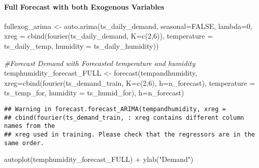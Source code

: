 \documentclass[
]{article}
\newenvironment{Shaded}{\begin{snugshade}}{\end{snugshade}}
\newcommand{\AttributeTok}[1]{\textcolor[rgb]{0.77,0.63,0.00}{#1}}
\newcommand{\CommentTok}[1]{\textcolor[rgb]{0.56,0.35,0.01}{\textit{#1}}}
\newcommand{\ConstantTok}[1]{\textcolor[rgb]{0.00,0.00,0.00}{#1}}
\newcommand{\DecValTok}[1]{\textcolor[rgb]{0.00,0.00,0.81}{#1}}
\newcommand{\FunctionTok}[1]{\textcolor[rgb]{0.00,0.00,0.00}{#1}}
\newcommand{\NormalTok}[1]{#1}
\newcommand{\OtherTok}[1]{\textcolor[rgb]{0.56,0.35,0.01}{#1}}
\newcommand{\SpecialCharTok}[1]{\textcolor[rgb]{0.00,0.00,0.00}{#1}}
\newcommand{\StringTok}[1]{\textcolor[rgb]{0.31,0.60,0.02}{#1}}
\begin{document}
\hypertarget{full-forecast-with-both-exogenous-variables}{%
\paragraph{Full Forecast with both Exogenous
Variables}\label{full-forecast-with-both-exogenous-variables}}

\begin{Shaded}
\begin{Highlighting}[]
\NormalTok{fullexog\_arima }\OtherTok{\textless{}{-}} \FunctionTok{auto.arima}\NormalTok{(ts\_daily\_demand, }
                             \AttributeTok{seasonal=}\ConstantTok{FALSE}\NormalTok{, }
                             \AttributeTok{lambda=}\DecValTok{0}\NormalTok{,}
         \AttributeTok{xreg =} \FunctionTok{cbind}\NormalTok{(}\FunctionTok{fourier}\NormalTok{(ts\_daily\_demand, }
                                          \AttributeTok{K=}\FunctionTok{c}\NormalTok{(}\DecValTok{2}\NormalTok{,}\DecValTok{6}\NormalTok{)),}
                      \AttributeTok{temperature =}\NormalTok{ ts\_daily\_temp,}
                      \AttributeTok{humidity =}\NormalTok{ ts\_daily\_humidity))}

\CommentTok{\#Forecast Demand with Forecasted temperature and humidity}
\NormalTok{temphumidity\_forecast\_FULL }\OtherTok{\textless{}{-}} \FunctionTok{forecast}\NormalTok{(tempandhumidity,}
                           \AttributeTok{xreg=}\FunctionTok{cbind}\NormalTok{(}\FunctionTok{fourier}\NormalTok{(ts\_demand\_train, }
                                          \AttributeTok{K=}\FunctionTok{c}\NormalTok{(}\DecValTok{2}\NormalTok{,}\DecValTok{6}\NormalTok{),}
                                          \AttributeTok{h=}\NormalTok{n\_forecast),}
                                \AttributeTok{temperature =}\NormalTok{ ts\_temp\_for, }
                                \AttributeTok{humidity =}\NormalTok{ ts\_humid\_for),}
                           \AttributeTok{h=}\NormalTok{n\_forecast) }
\end{Highlighting}
\end{Shaded}

\begin{verbatim}
## Warning in forecast.forecast_ARIMA(tempandhumidity, xreg =
## cbind(fourier(ts_demand_train, : xreg contains different column names from the
## xreg used in training. Please check that the regressors are in the same order.
\end{verbatim}

\begin{Shaded}
\begin{Highlighting}[]
\FunctionTok{autoplot}\NormalTok{(temphumidity\_forecast\_FULL) }\SpecialCharTok{+} \FunctionTok{ylab}\NormalTok{(}\StringTok{"Demand"}\NormalTok{)}
\end{Highlighting}
\end{Shaded}
\end{document}
